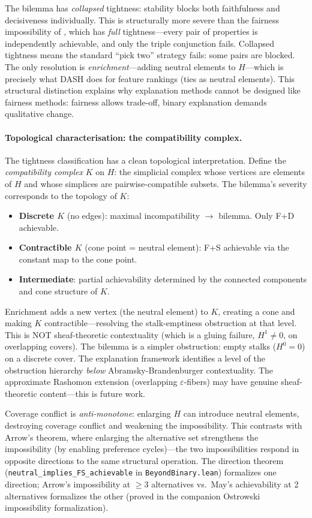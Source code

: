 \documentclass{article}
\begin{document}
The bilemma has \emph{collapsed} tightness: stability blocks both faithfulness and decisiveness individually. This is structurally more severe than the fairness impossibility of \citet{chouldechova2017fair}, which has \emph{full} tightness---every pair of properties is independently achievable, and only the triple conjunction fails. Collapsed tightness means the standard ``pick two'' strategy fails: some pairs are blocked. The only resolution is \emph{enrichment}---adding neutral elements to $H$---which is precisely what DASH does for feature rankings (ties as neutral elements). This structural distinction explains why explanation methods cannot be designed like fairness methods: fairness allows trade-off, binary explanation demands qualitative change.

\paragraph{Topological characterisation: the compatibility complex.}
The tightness classification has a clean topological interpretation. Define the \emph{compatibility complex} $K$ on $H$: the simplicial complex whose vertices are elements of $H$ and whose simplices are pairwise-compatible subsets. The bilemma's severity corresponds to the topology of $K$:
\begin{itemize}
  \item \textbf{Discrete $K$} (no edges): maximal incompatibility $\to$ bilemma. Only F+D achievable.
  \item \textbf{Contractible $K$} (cone point = neutral element): F+S achievable via the constant map to the cone point.
  \item \textbf{Intermediate}: partial achievability determined by the connected components and cone structure of $K$.
\end{itemize}

Enrichment adds a new vertex (the neutral element) to $K$, creating a cone and making $K$ contractible---resolving the stalk-emptiness obstruction at that level. This is NOT sheaf-theoretic contextuality (which is a gluing failure, $H^1 \neq 0$, on overlapping covers). The bilemma is a simpler obstruction: empty stalks ($H^0 = 0$) on a discrete cover. The explanation framework identifies a level of the obstruction hierarchy \emph{below} Abramsky-Brandenburger contextuality. The approximate Rashomon extension (overlapping $\varepsilon$-fibers) may have genuine sheaf-theoretic content---this is future work.

Coverage conflict is \emph{anti-monotone}: enlarging $H$ can introduce neutral elements, destroying coverage conflict and weakening the impossibility.
This contrasts with Arrow's theorem, where enlarging the alternative set strengthens the impossibility (by enabling preference cycles)---the two impossibilities respond in opposite directions to the same structural operation.
The direction theorem (\texttt{neutral\_implies\_FS\_achievable} in \texttt{BeyondBinary.lean}) formalizes one direction; Arrow's impossibility at ${\geq}3$ alternatives vs.\ May's achievability at 2 alternatives formalizes the other (proved in the companion Ostrowski impossibility formalization).
\end{document}
